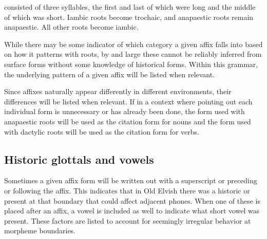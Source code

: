 \documentclass[a4paper,11pt,oneside,openany]{memoir}
\begin{document}
\begin{description}[labelindent=30pt,leftmargin=*,rightmargin=30pt]
\begin{center}
    \end{center}
    \item[Cretic:] consisted of three syllables, the first and last of which were long and the middle of which was short. Iambic roots become trochaic, and anapaestic roots remain anapaestic. All other roots become iambic.
    \begin{center}
    \end{center} 
\end{description}
While there may be some indicator of which category a given affix falls into based on how it patterns with roots, by and large these cannot be reliably inferred from surface forms without some knowledge of historical forms. Within this grammar, the underlying pattern of a given affix will be listed when relevant. 

Since affixes naturally appear differently in different environments, their differences will be listed when relevant. If in a context where pointing out each individual form is unnecessary or has already been done, the form used with anapaestic roots will be used as the citation form for nouns and the form used with dactylic roots will be used as the citation form for verbs.

\subsection{Historic glottals and vowels}

Sometimes a given affix form will be written out with a superscript \supho{} or \supglot{} preceding or following the affix. This indicates that in Old Elvish there was a historic  or \proto{\glotstop} present at that boundary that could affect adjacent phones. When one of these is placed after an affix, a vowel is included as well to indicate what short vowel was present. These factors are listed to account for seemingly irregular behavior at morpheme boundaries.
\end{document}
